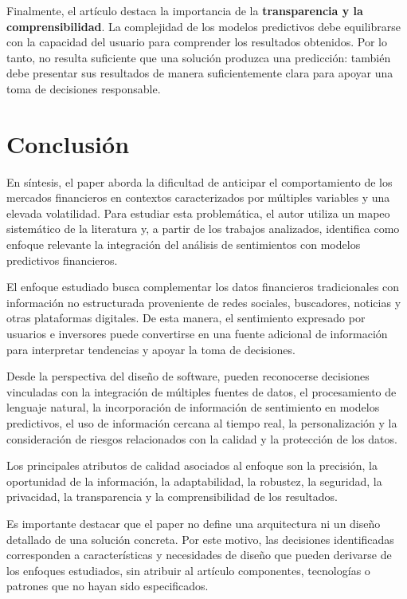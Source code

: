 \vspace{2mm}

Finalmente, el artículo destaca la importancia de la \textbf{transparencia y la comprensibilidad}. La complejidad de los modelos predictivos debe equilibrarse con la capacidad del usuario para comprender los resultados obtenidos. Por lo tanto, no resulta suficiente que una solución produzca una predicción: también debe presentar sus resultados de manera suficientemente clara para apoyar una toma de decisiones responsable.


\section{Conclusión}
\vspace{2mm}

En síntesis, el paper aborda la dificultad de anticipar el comportamiento de los mercados financieros en contextos caracterizados por múltiples variables y una elevada volatilidad. Para estudiar esta problemática, el autor utiliza un mapeo sistemático de la literatura y, a partir de los trabajos analizados, identifica como enfoque relevante la integración del análisis de sentimientos con modelos predictivos financieros.

\vspace{2mm}

El enfoque estudiado busca complementar los datos financieros tradicionales con información no estructurada proveniente de redes sociales, buscadores, noticias y otras plataformas digitales. De esta manera, el sentimiento expresado por usuarios e inversores puede convertirse en una fuente adicional de información para interpretar tendencias y apoyar la toma de decisiones.

\vspace{2mm}

Desde la perspectiva del diseño de software, pueden reconocerse decisiones vinculadas con la integración de múltiples fuentes de datos, el procesamiento de lenguaje natural, la incorporación de información de sentimiento en modelos predictivos, el uso de información cercana al tiempo real, la personalización y la consideración de riesgos relacionados con la calidad y la protección de los datos.

\vspace{2mm}

Los principales atributos de calidad asociados al enfoque son la precisión, la oportunidad de la información, la adaptabilidad, la robustez, la seguridad, la privacidad, la transparencia y la comprensibilidad de los resultados.

\vspace{2mm}

Es importante destacar que el paper no define una arquitectura ni un diseño detallado de una solución concreta. Por este motivo, las decisiones identificadas corresponden a características y necesidades de diseño que pueden derivarse de los enfoques estudiados, sin atribuir al artículo componentes, tecnologías o patrones que no hayan sido especificados.